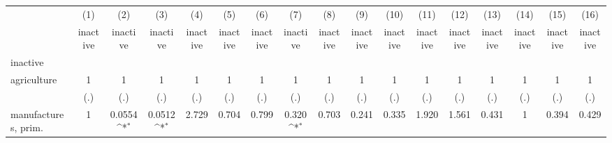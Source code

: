 {
\def\sym#1{\ifmmode^{#1}\else\(^{#1}\)\fi}
\begin{tabular}{l*{16}{c}}
\hline\hline
                    &\multicolumn{1}{c}{(1)}&\multicolumn{1}{c}{(2)}&\multicolumn{1}{c}{(3)}&\multicolumn{1}{c}{(4)}&\multicolumn{1}{c}{(5)}&\multicolumn{1}{c}{(6)}&\multicolumn{1}{c}{(7)}&\multicolumn{1}{c}{(8)}&\multicolumn{1}{c}{(9)}&\multicolumn{1}{c}{(10)}&\multicolumn{1}{c}{(11)}&\multicolumn{1}{c}{(12)}&\multicolumn{1}{c}{(13)}&\multicolumn{1}{c}{(14)}&\multicolumn{1}{c}{(15)}&\multicolumn{1}{c}{(16)}\\
                    &\multicolumn{1}{c}{inactive}&\multicolumn{1}{c}{inactive}&\multicolumn{1}{c}{inactive}&\multicolumn{1}{c}{inactive}&\multicolumn{1}{c}{inactive}&\multicolumn{1}{c}{inactive}&\multicolumn{1}{c}{inactive}&\multicolumn{1}{c}{inactive}&\multicolumn{1}{c}{inactive}&\multicolumn{1}{c}{inactive}&\multicolumn{1}{c}{inactive}&\multicolumn{1}{c}{inactive}&\multicolumn{1}{c}{inactive}&\multicolumn{1}{c}{inactive}&\multicolumn{1}{c}{inactive}&\multicolumn{1}{c}{inactive}\\
\hline
inactive            &                     &                     &                     &                     &                     &                     &                     &                     &                     &                     &                     &                     &                     &                     &                     &                     \\
agriculture         &           1         &           1         &           1         &           1         &           1         &           1         &           1         &           1         &           1         &           1         &           1         &           1         &           1         &           1         &           1         &           1         \\
                    &         (.)         &         (.)         &         (.)         &         (.)         &         (.)         &         (.)         &         (.)         &         (.)         &         (.)         &         (.)         &         (.)         &         (.)         &         (.)         &         (.)         &         (.)         &         (.)         \\
[1em]
manufactures, prim. &           1         &      0.0554\sym{*}  &      0.0512\sym{*}  &       2.729         &       0.704         &       0.799         &       0.320\sym{*}  &       0.703         &       0.241         &       0.335         &       1.920         &       1.561         &       0.431         &           1         &       0.394         &       0.429         \\

\end{tabular}}
